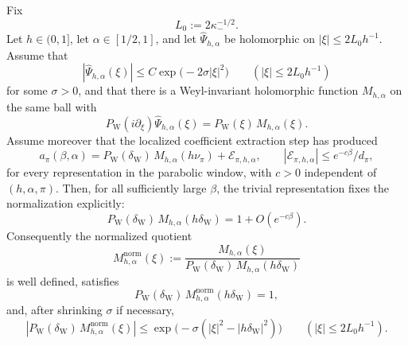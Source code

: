 \begin{lemma}\label{lem:A1_low_multiplier_normalization}
Fix
\[
L_0:=2\kappa_-^{-1/2}.
\]
Let $h\in(0,1]$, let $\alpha\in[1/2,1]$, and let $\widehat\Psi_{h,\alpha}$ be holomorphic on $|\xi|\le 2L_0h^{-1}$.
Assume that
\[
|\widehat\Psi_{h,\alpha}(\xi)|
\le
C\exp\!\bigl(-2\sigma|\xi|^2\bigr)
\qquad (|\xi|\le 2L_0h^{-1})
\]
for some $\sigma>0$, and that there is a Weyl-invariant holomorphic function $M_{h,\alpha}$ on the same ball with
\[
P_{\mathrm W}(i\partial_\xi)\widehat\Psi_{h,\alpha}(\xi)
=
P_{\mathrm W}(\xi)\,M_{h,\alpha}(\xi).
\]
Assume moreover that the localized coefficient extraction step has produced
\begin{equation}\label{eq:A1_low_local_coefficient_formula}
a_\pi(\beta,\alpha)
=
P_{\mathrm W}(\delta_{\mathrm W})\,M_{h,\alpha}(h\nu_\pi)+\mathcal E_{\pi,h,\alpha},
\qquad
|\mathcal E_{\pi,h,\alpha}|\le e^{-c\beta}/d_\pi,
\end{equation}
for every representation in the parabolic window, with $c>0$ independent of $(h,\alpha,\pi)$.
Then, for all sufficiently large $\beta$, the trivial representation fixes the normalization explicitly:
\begin{equation}\label{eq:A1_low_multiplier_trivial_mode}
P_{\mathrm W}(\delta_{\mathrm W})\,M_{h,\alpha}(h\delta_{\mathrm W})
=
1+O(e^{-c\beta}).
\end{equation}
Consequently the normalized quotient
\[
M_{h,\alpha}^{\mathrm{norm}}(\xi)
:=
\frac{M_{h,\alpha}(\xi)}{P_{\mathrm W}(\delta_{\mathrm W})\,M_{h,\alpha}(h\delta_{\mathrm W})}
\]
is well defined, satisfies
\[
P_{\mathrm W}(\delta_{\mathrm W})\,M_{h,\alpha}^{\mathrm{norm}}(h\delta_{\mathrm W})=1,
\]
and, after shrinking $\sigma$ if necessary,
\begin{equation}\label{eq:A1_low_multiplier_bound}
|P_{\mathrm W}(\delta_{\mathrm W})\,M_{h,\alpha}^{\mathrm{norm}}(\xi)|
\le
\exp\!\bigl(-\sigma(|\xi|^2-|h\delta_{\mathrm W}|^2)\bigr)
\qquad (|\xi|\le 2L_0h^{-1}).
\end{equation}
\end{lemma}

